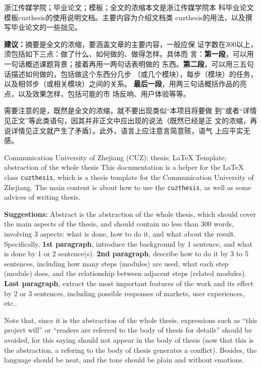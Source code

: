 \begin{chineseabstract}
    {浙江传媒学院；毕业论文；模板；全文的浓缩}本文是浙江传媒学院本
    科毕业论文模板cuzthesis的使用说明文档。主要内容为介绍文档类
    cuzthesis的用法，以及撰写毕业论文的一些拙见。

    \begin{leftbar}
        \noindent\textbf{建议：}摘要是全文的浓缩，要涵盖文章的主要内容，一般应保
        证字数在300以上，须包括如下三点：做了什么、如何做的、做得怎样。具体而
        言：\textbf{第一段}，可以用一句话概述课题背景；接着再用一两句话表明做的
        东西。\textbf{第二段}，可以用三五句话描述如何做的，包括做这个东西分几步
        （或几个模块），每步（模块）的任务，以及相邻步（或相关模块）之间的关系。
        \textbf{最后一段}，用两三句话概括作品的亮点，以及效果怎样，包括可能的市
        场反响、用户体验等等。
        
        \noindent{}需要注意的是，既然是全文的浓缩，就不要出现类似“本项目将要做
        到”或者“详情见正文”等此类语句，因其并非正文中应出现的说法（既然已经是正
        文的浓缩，再说详情见正文就产生了矛盾）。此外，语言上应注意言简意赅，语气
        上应平实无感。
    \end{leftbar}
\end{chineseabstract}
\begin{englishabstract}
    {Communication University of Zhejiang (CUZ); thesis; \LaTeX{} Template;
    abstraction of the whole thesis} This documentation is a helper for the
    \LaTeX{} class \texttt{cuzthesis}, which is a thesis template for the
    Communication University of Zhejiang. The main content is about how to use
    the \texttt{cuzthesis}, as well as some advices of writing thesis.

    \begin{leftbar}
        \noindent\textbf{Suggestions:} Abstract is the abstraction of the whole
        thesis, which should cover the main aspects of the thesis, and should
        contain no less than 300 words, involving 3 aspects: what is done, how
        to do it, and what about the result. Specifically, \textbf{1st
        paragraph}, introduce the background by 1 sentence, and what is done by
        1 or 2 sentence(s). \textbf{2nd paragraph}, describe how to do it by 3
        to 5 sentences, including how many steps (modules) are used, what each
        step (module) does, and the relationship between adjacent steps (related
        modules). \textbf{Last paragraph}, extract the most important features
        of the work and its effect by 2 or 3 sentences, including possible
        responses of markets, user experiences, etc..
    	
    	\noindent Note that, since it is the abstraction of the whole thesis,
    	expressions such as ``this project will'' or ``readers are referred to
    	the body of thesis for details'' should be avoided, for this saying
    	should not appear in the body of thesis (now that this is the
    	abstraction, a refering to the body of thesis generates a conflict).
    	Besides, the language should be neat, and the tone should be plain and
    	without emotions.
    \end{leftbar}
\end{englishabstract}